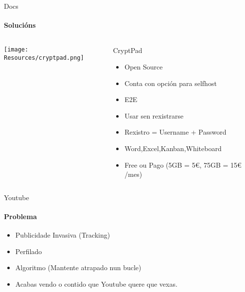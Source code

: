 \documentclass{beamer}
\begin{document}
\begin{frame}{Docs}
  \framesubtitle{Solucións}

  \begin{columns}
    \begin{column}{0.5\textwidth}
      \texttt{[image: Resources/cryptpad.png]}

      \vspace{1cm}


    \end{column}

    \begin{column}{0.4\textwidth}
      \begin{block}{CryptPad}
        \begin{itemize}
          \item Open Source
          \item Conta con opción para selfhost
          \item E2E
          \item Usar sen rexistrarse
          \item Rexistro = Username + Password
          \item Word,Excel,Kanban,Whiteboard
          \item Free ou Pago (5GB = 5€, 75GB = 15€ /mes)
        \end{itemize}
      \end{block}

    \end{column}

  \end{columns}

\end{frame}




\begin{frame}{Youtube}
  \framesubtitle{Problema}

  \begin{itemize}
    \item Publicidade Invasiva (Tracking)
    \item Perfilado
    \item Algoritmo (Mantente atrapado nun bucle)
    \item Acabas vendo o contido que Youtube quere que vexas.
  \end{itemize}

\end{frame}
\end{document}
